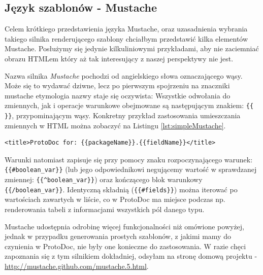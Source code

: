 \documentclass[pdflatex,11pt]{aghdpl}
\begin{document}
\subsection{Język szablonów - Mustache}
\label{sec:mustache}
Celem krótkiego przedstawienia języka Mustache, oraz uzasadnienia wybrania takiego silnika renderującego szablony chciałbym przedstawić kilka elementów Mustache.
Posłużymy się jedynie kilkuliniowymi przykładami, aby nie zaciemniać obrazu HTMLem który aż tak interesujący z naszej perspektywy nie jest.

Nazwa silnika \textit{Mustache} pochodzi od angielskiego słowa oznaczającego wąsy. Może się to wydawać dziwne, lecz po pierwszym spojrzeniu na 
znaczniki mustache etymologia nazwy staje się oczywista: Wszystkie odwołania do zmiennych, jak i operacje warunkowe obejmowane są 
następującym znakiem: \verb|{{  }}|, przypominającym wąsy. Konkretny przykład zastosowania umieszczania zmiennych w HTML można zobaczyć na Listingu \ref{lst:simpleMustache}.

\begin{lstlisting}[label={lst:simpleMustache}]
<title>ProtoDoc for: {{packageName}}.{{fieldName}}</title>
\end{lstlisting}

Warunki natomiast zapisuje się przy pomocy znaku rozpoczynającego warunek: \verb|{{#boolean_var}}| (lub jego odpowiednikowi negującemy wartość w sprawdzanej zmiennej:
\verb|{{^boolean_var}}|) oraz kończącego blok warunkowy \verb|{{/boolean_var}}|. 
Identyczną składnią (\verb|{{#fields}}|) można iterować po wartościach zawartych w liście, co w ProtoDoc ma miejsce podczas np. renderowania
tabeli z informacjami wszystkich pól danego typu.

Mustache udostępnia odrobinę więcej funkcjonalności niż omówione powyżej, jednak w przypadku generowania prostych szablonów, 
z jakimi mamy do czynienia w ProtoDoc, nie były one konieczne do zastosowania. W razie chęci zapoznania się z tym silnikiem dokładniej,
odsyłam na stronę domową projektu - \href{http://mustache.github.com/mustache.5.html}{http://mustache.github.com/mustache.5.html}.


% 
\end{document}
